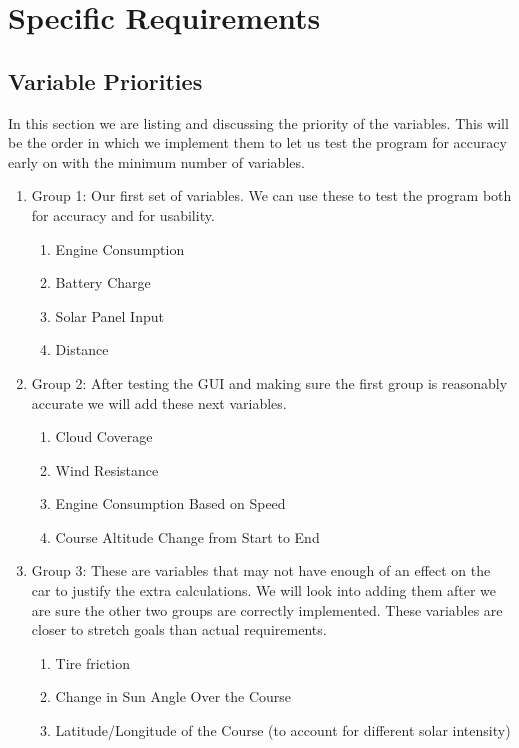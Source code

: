 \documentclass[onecolumn, draftclsnofoot,10pt, compsoc]{IEEEtran}
\begin{document}
\section{Specific Requirements}

    \subsection{Variable Priorities}
    In this section we are listing and discussing the priority of the variables. This will be the order in which we implement them to let us test the program for accuracy early on with the minimum number of variables.
    \begin{enumerate}
        \item Group 1: Our first set of variables. We can use these to test the program both for accuracy and for usability.
        \begin{enumerate}
            \item Engine Consumption
            \item Battery Charge
            \item Solar Panel Input
            \item Distance
        \end{enumerate}
        \item Group 2: After testing the GUI and making sure the first group is reasonably accurate we will add these next variables.
        \begin{enumerate}
            \item Cloud Coverage
            \item Wind Resistance
            \item Engine Consumption Based on Speed
            \item Course Altitude Change from Start to End
        \end{enumerate}
        \item Group 3: These are variables that may not have enough of an effect on the car to justify the extra calculations. We will look into adding them after we are sure the other two groups are correctly implemented. These variables are closer to stretch goals than actual requirements.
        \begin{enumerate}
            \item Tire friction
            \item Change in Sun Angle Over the Course
            \item Latitude/Longitude of the Course (to account for different solar intensity)
        \end{enumerate}
    \end{enumerate}
    
\end{document}
